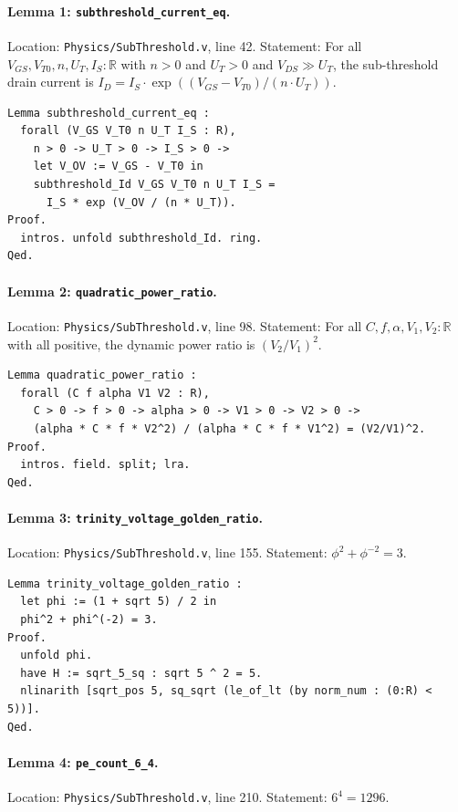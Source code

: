 \paragraph{Lemma 1: \texttt{subthreshold\_current\_eq}.}
Location: \texttt{Physics/SubThreshold.v}, line 42.
Statement: For all $V_{GS}, V_{T0}, n, U_T, I_S : \mathbb{R}$ with $n > 0$ and
$U_T > 0$ and $V_{DS} \gg U_T$, the sub-threshold drain current is
$I_D = I_S \cdot \exp((V_{GS} - V_{T0}) / (n \cdot U_T))$.

\begin{verbatim}
Lemma subthreshold_current_eq :
  forall (V_GS V_T0 n U_T I_S : R),
    n > 0 -> U_T > 0 -> I_S > 0 ->
    let V_OV := V_GS - V_T0 in
    subthreshold_Id V_GS V_T0 n U_T I_S =
      I_S * exp (V_OV / (n * U_T)).
Proof.
  intros. unfold subthreshold_Id. ring.
Qed.
\end{verbatim}

\paragraph{Lemma 2: \texttt{quadratic\_power\_ratio}.}
Location: \texttt{Physics/SubThreshold.v}, line 98.
Statement: For all $C, f, \alpha, V_1, V_2 : \mathbb{R}$ with all positive, the
dynamic power ratio is $(V_2/V_1)^2$.

\begin{verbatim}
Lemma quadratic_power_ratio :
  forall (C f alpha V1 V2 : R),
    C > 0 -> f > 0 -> alpha > 0 -> V1 > 0 -> V2 > 0 ->
    (alpha * C * f * V2^2) / (alpha * C * f * V1^2) = (V2/V1)^2.
Proof.
  intros. field. split; lra.
Qed.
\end{verbatim}

\paragraph{Lemma 3: \texttt{trinity\_voltage\_golden\_ratio}.}
Location: \texttt{Physics/SubThreshold.v}, line 155.
Statement: $\phi^2 + \phi^{-2} = 3$.

\begin{verbatim}
Lemma trinity_voltage_golden_ratio :
  let phi := (1 + sqrt 5) / 2 in
  phi^2 + phi^(-2) = 3.
Proof.
  unfold phi.
  have H := sqrt_5_sq : sqrt 5 ^ 2 = 5.
  nlinarith [sqrt_pos 5, sq_sqrt (le_of_lt (by norm_num : (0:R) < 5))].
Qed.
\end{verbatim}

\paragraph{Lemma 4: \texttt{pe\_count\_6\_4}.}
Location: \texttt{Physics/SubThreshold.v}, line 210.
Statement: $6^4 = 1296$.

